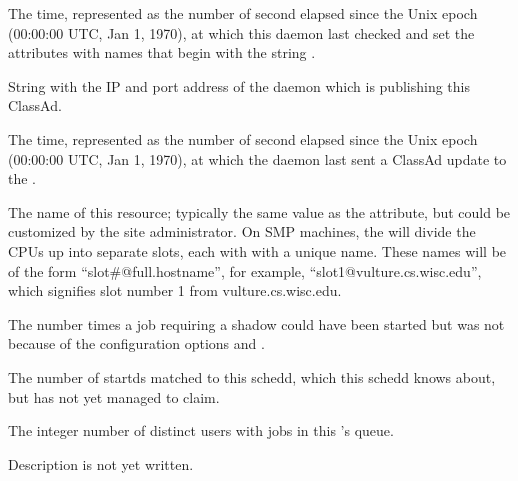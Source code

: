 \begin{description}
\item[\AdAttr{MonitorSelfTime}:] The  time, represented as the number of
  second elapsed since the Unix epoch (00:00:00 UTC, Jan 1, 1970),
  at which this daemon last checked and set the attributes with names that
  begin with the string .
  
\item[\AdAttr{MyAddress}:] String with the IP and port address of the
 daemon which is publishing this ClassAd.

\item[\AdAttr{MyCurrentTime}:]  The time, represented as the number of 
  second elapsed since the Unix epoch (00:00:00 UTC, Jan 1, 1970),
  at which the  daemon last sent a ClassAd update to the
  .

\item[\AdAttr{Name}:] The name of this resource; typically the same value as
  the  attribute, but could be customized by the site
  administrator.
  On SMP machines, the  will divide the CPUs up into separate
  slots, each with with a unique name.
  These names will be of the form ``slot\#@full.hostname'', for example,
  ``slot1@vulture.cs.wisc.edu'', which signifies slot number 1 from
  vulture.cs.wisc.edu.

\item[\AdAttr{NumJobStartsDelayed}:] The number times a job requiring a
shadow could have been started but was not because of the configuration options
 and .

\item[\AdAttr{NumPendingClaims}:] The number of startds matched to this schedd,
which this schedd knows about, but has not yet managed to claim.

\item[\AdAttr{NumUsers}:] The integer number of distinct users with jobs in
  this 's queue.

\item[\AdAttr{PublicNetworkIpAddr}:] Description is not yet written.


\end{description}
